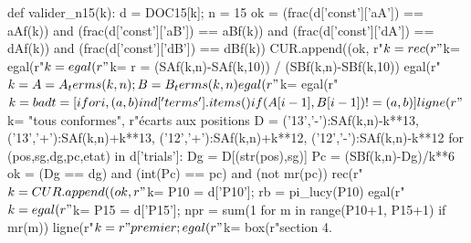 \documentclass[11pt,a4paper]{article}
\begin{document}
\begin{pycode}
def valider_n15(k):
    d = DOC15[k]; n = 15
    ok = (frac(d['const']['aA']) == aAf(k)) and (frac(d['const']['aB']) == aBf(k)) and (frac(d['const']['dA']) == dAf(k)) and (frac(d['const']['dB']) == dBf(k))
    CUR.append((ok, r"$k=%
    rec(r"$k=%
    egal(r"$k=%
    egal(r"$k=%
    r = (SAf(k,n)-SAf(k,10)) / (SBf(k,n)-SBf(k,10))
    egal(r"$k=%
    A = A_terms(k,n); B = B_terms(k,n)
    egal(r"$k=%
    egal(r"$k=%
    badt = [i for i,(a,b) in d['terms'].items() if (A[i-1], B[i-1]) != (a,b)]
    ligne(r"$k=%
          "tous conformes", r"écarts aux positions %
    D = {('13','-'):SAf(k,n)-k**13, ('13','+'):SAf(k,n)+k**13, ('12','+'):SAf(k,n)+k**12, ('12','-'):SAf(k,n)-k**12}
    for (pos,sg,dg,pc,etat) in d['trials']:
        Dg = D[(str(pos),sg)]
        Pc = (SBf(k,n)-Dg)/k**6
        ok = (Dg == dg) and (int(Pc) == pc) and (not mr(pc))
        rec(r"$k=%
        CUR.append((ok, r"$k=%
    P10 = d['P10']; rb = pi_lucy(P10)
    egal(r"$k=%
    egal(r"$k=%
    P15 = d['P15']; npr = sum(1 for m in range(P10+1, P15+1) if mr(m))
    ligne(r"$k=%
          r"premier ; %
    egal(r"$k=%
    box(r"section 4.%
\end{pycode}
\end{document}
